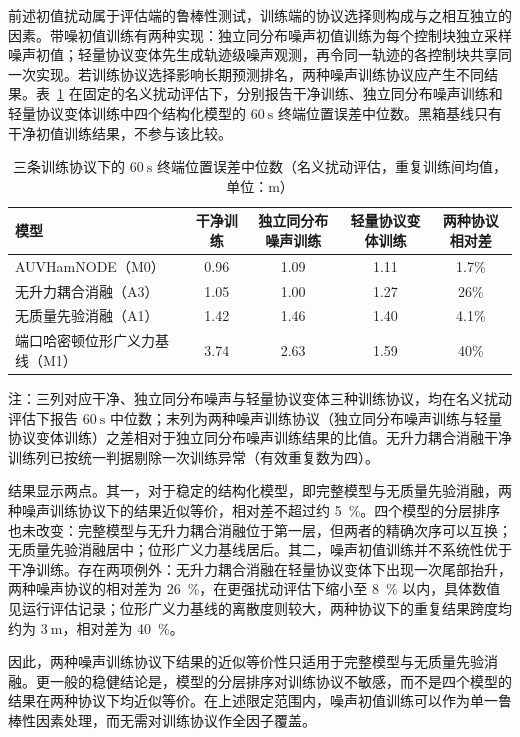 \documentclass[UTF8,zihao=-4]{ctexrep}
\begin{document}
前述初值扰动属于评估端的鲁棒性测试，训练端的协议选择则构成与之相互独立的因素。带噪初值训练有两种实现：独立同分布噪声初值训练为每个控制块独立采样噪声初值；轻量协议变体先生成轨迹级噪声观测，再令同一轨迹的各控制块共享同一次实现。若训练协议选择影响长期预测排名，两种噪声训练协议应产生不同结果。表~\ref{tab:s8-protocol} 在固定的名义扰动评估下，分别报告干净训练、独立同分布噪声训练和轻量协议变体训练中四个结构化模型的 \(60~\mathrm{s}\) 终端位置误差中位数。黑箱基线只有干净初值训练结果，不参与该比较。

\begin{table}[htbp]
  \centering
  \caption{三条训练协议下的 \(60~\mathrm{s}\) 终端位置误差中位数（名义扰动评估，重复训练间均值，单位：\(\mathrm{m}\)）}
  \label{tab:s8-protocol}
  \small
  \begin{tabularx}{\textwidth}{>{\raggedright\arraybackslash}Xcccc}
    \toprule
    模型 & 干净训练 & 独立同分布噪声训练 & 轻量协议变体训练 & 两种协议相对差 \\
    \midrule
    AUVHamNODE（M0）& 0.96 & 1.09 & 1.11 & 1.7\% \\
    无升力耦合消融（A3）& 1.05 & 1.00 & 1.27 & 26\% \\
    无质量先验消融（A1）& 1.42 & 1.46 & 1.40 & 4.1\% \\
    端口哈密顿位形广义力基线（M1）& 3.74 & 2.63 & 1.59 & 40\% \\
    \bottomrule
  \end{tabularx}
  \par\vspace{2pt}
  \footnotesize 注：三列对应干净、独立同分布噪声与轻量协议变体三种训练协议，均在名义扰动评估下报告 \(60~\mathrm{s}\) 中位数；末列为两种噪声训练协议（独立同分布噪声训练与轻量协议变体训练）之差相对于独立同分布噪声训练结果的比值。无升力耦合消融干净训练列已按统一判据剔除一次训练异常（有效重复数为四）。
\end{table}

结果显示两点。其一，对于稳定的结构化模型，即完整模型与无质量先验消融，两种噪声训练协议下的结果近似等价，相对差不超过约 5~\%。四个模型的分层排序也未改变：完整模型与无升力耦合消融位于第一层，但两者的精确次序可以互换；无质量先验消融居中；位形广义力基线居后。其二，噪声初值训练并不系统性优于干净训练。存在两项例外：无升力耦合消融在轻量协议变体下出现一次尾部抬升，两种噪声协议的相对差为 26~\%，在更强扰动评估下缩小至 8~\% 以内，具体数值见运行评估记录；位形广义力基线的离散度则较大，两种协议下的重复结果跨度均约为 \(3~\mathrm{m}\)，相对差为 40~\%。

因此，两种噪声训练协议下结果的近似等价性只适用于完整模型与无质量先验消融。更一般的稳健结论是，模型的分层排序对训练协议不敏感，而不是四个模型的结果在两种协议下均近似等价。在上述限定范围内，噪声初值训练可以作为单一鲁棒性因素处理，而无需对训练协议作全因子覆盖。
\end{document}
